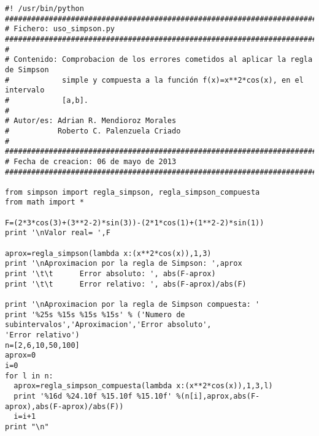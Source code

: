 \begin{center}
\begin{footnotesize}
\begin{verbatim}
#! /usr/bin/python
###################################################################################
# Fichero: uso_simpson.py
###################################################################################
#
# Contenido: Comprobacion de los errores cometidos al aplicar la regla de Simpson
#            simple y compuesta a la función f(x)=x**2*cos(x), en el intervalo
#            [a,b].
#
# Autor/es: Adrian R. Mendioroz Morales
#           Roberto C. Palenzuela Criado
#
###################################################################################
# Fecha de creacion: 06 de mayo de 2013 
###################################################################################

from simpson import regla_simpson, regla_simpson_compuesta
from math import *

F=(2*3*cos(3)+(3**2-2)*sin(3))-(2*1*cos(1)+(1**2-2)*sin(1))
print '\nValor real= ',F

aprox=regla_simpson(lambda x:(x**2*cos(x)),1,3)
print '\nAproximacion por la regla de Simpson: ',aprox
print '\t\t      Error absoluto: ', abs(F-aprox)
print '\t\t      Error relativo: ', abs(F-aprox)/abs(F)

print '\nAproximacion por la regla de Simpson compuesta: '
print '%25s %15s %15s %15s' % ('Numero de subintervalos','Aproximacion','Error absoluto',
'Error relativo')
n=[2,6,10,50,100]
aprox=0
i=0
for l in n:
  aprox=regla_simpson_compuesta(lambda x:(x**2*cos(x)),1,3,l)
  print '%16d %24.10f %15.10f %15.10f' %(n[i],aprox,abs(F-aprox),abs(F-aprox)/abs(F))
  i=i+1
print "\n"
\end{verbatim}
\end{footnotesize}
\end{center}
